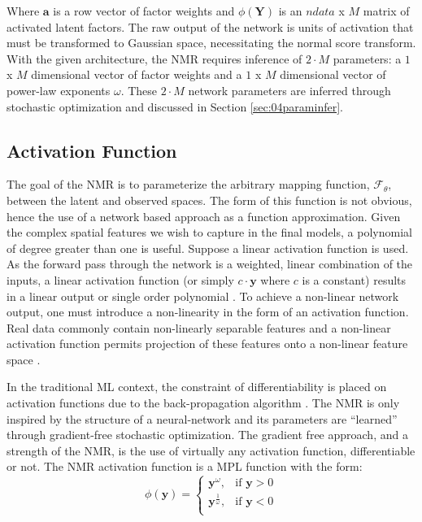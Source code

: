 Where $\mathbf{a}$ is a row vector of factor weights and $\phi\left(\mathbf{Y} \right)$ is an $ndata$ x $M$ matrix of activated latent factors. The raw output of the network is units of activation that must be transformed to Gaussian space, necessitating the normal score transform. With the given architecture, the \gls{NMR} requires inference of $2 \cdot M$ parameters: a $1$ x $M$ dimensional vector of factor weights and a $1$ x $M$ dimensional vector of power-law exponents $\omega$. These $2 \cdot M$ network parameters are inferred through stochastic optimization and discussed in Section \ref{sec:04paraminfer}.

\subsection{Activation Function}
\label{subsec:04activation}

The goal of the \gls{NMR} is to parameterize the arbitrary mapping function, $\mathcal{F}_{\theta}$, between the latent and observed spaces. The form of this function is not obvious, hence the use of a network based approach as a function approximation. Given the complex spatial features we wish to capture in the final models, a polynomial of degree greater than one is useful. Suppose a linear activation function is used. As the forward pass through the network is a weighted, linear combination of the inputs, a linear activation function (or simply $c \cdot \mathbf{y}$ where $c$ is a constant) results in a linear output or single order polynomial \citep{sharma2020activation}. To achieve a non-linear network output, one must introduce a non-linearity in the form of an activation function. Real data commonly contain non-linearly separable features and a non-linear activation function permits projection of these features onto a non-linear feature space \citep{dubey2022activation}.

In the traditional \gls{ML} context, the constraint of differentiability is placed on activation functions due to the back-propagation algorithm \citep{rojas1996backpropagation}. The \gls{NMR} is only inspired by the structure of a neural-network and its parameters are ``learned'' through gradient-free stochastic optimization. The gradient free approach, and a strength of the \gls{NMR}, is the use of virtually any activation function, differentiable or not. The \gls{NMR} activation function is a \gls{MPL} function with the form:
\begin{equation}
    \phi \left( \mathbf{y} \right) =
    \begin{cases}
        \mathbf{y}^{\omega},           & \text{if $\mathbf{y} > 0$} \\
        \mathbf{y}^{\frac{1}{\omega}}, & \text{if $\mathbf{y} < 0$} \\
    \end{cases}
    \label{eq:power}
\end{equation}

